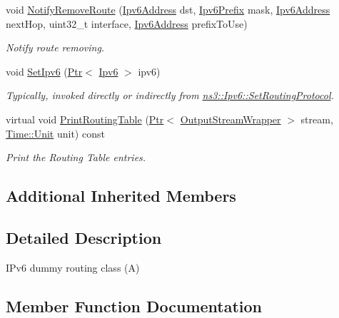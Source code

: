 \begin{DoxyCompactItemize}
void \hyperlink{classIpv6ARouting_a42019b27d60115b4c0450cd75c98f0b8}{Notify\+Remove\+Route} (\hyperlink{classns3_1_1Ipv6Address}{Ipv6\+Address} dst, \hyperlink{classns3_1_1Ipv6Prefix}{Ipv6\+Prefix} mask, \hyperlink{classns3_1_1Ipv6Address}{Ipv6\+Address} next\+Hop, uint32\+\_\+t interface, \hyperlink{classns3_1_1Ipv6Address}{Ipv6\+Address} prefix\+To\+Use)
\begin{DoxyCompactList}\small\item\em Notify route removing. \end{DoxyCompactList}\item 
void \hyperlink{classIpv6ARouting_a5cac88241076190c77179a637e548473}{Set\+Ipv6} (\hyperlink{classns3_1_1Ptr}{Ptr}$<$ \hyperlink{classns3_1_1Ipv6}{Ipv6} $>$ ipv6)
\begin{DoxyCompactList}\small\item\em Typically, invoked directly or indirectly from \hyperlink{classns3_1_1Ipv6_aa889d2174527a1df773d65974de83f8f}{ns3\+::\+Ipv6\+::\+Set\+Routing\+Protocol}. \end{DoxyCompactList}\item 
virtual void \hyperlink{classIpv6ARouting_a13eb58a576bf1357ae733891b0b6f27d}{Print\+Routing\+Table} (\hyperlink{classns3_1_1Ptr}{Ptr}$<$ \hyperlink{classns3_1_1OutputStreamWrapper}{Output\+Stream\+Wrapper} $>$ stream, \hyperlink{classns3_1_1Time_a87a7f4d29c68b047a72d291ad660295a}{Time\+::\+Unit} unit) const 
\begin{DoxyCompactList}\small\item\em Print the Routing Table entries. \end{DoxyCompactList}\end{DoxyCompactItemize}
\subsection*{Additional Inherited Members}


\subsection{Detailed Description}
I\+Pv6 dummy routing class (A) 

\subsection{Member Function Documentation}
